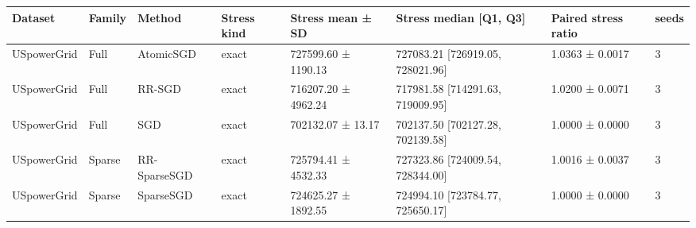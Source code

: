 \begin{tabular}{llllllll}
\hline
Dataset & Family & Method & Stress kind & Stress mean ± SD & Stress median [Q1, Q3] & Paired stress ratio & seeds \\
\hline
USpowerGrid & Full & AtomicSGD & exact & 727599.60 ± 1190.13 & 727083.21 [726919.05, 728021.96] & 1.0363 ± 0.0017 & 3 \\
USpowerGrid & Full & RR-SGD & exact & 716207.20 ± 4962.24 & 717981.58 [714291.63, 719009.95] & 1.0200 ± 0.0071 & 3 \\
USpowerGrid & Full & SGD & exact & 702132.07 ± 13.17 & 702137.50 [702127.28, 702139.58] & 1.0000 ± 0.0000 & 3 \\
USpowerGrid & Sparse & RR-SparseSGD & exact & 725794.41 ± 4532.33 & 727323.86 [724009.54, 728344.00] & 1.0016 ± 0.0037 & 3 \\
USpowerGrid & Sparse & SparseSGD & exact & 724625.27 ± 1892.55 & 724994.10 [723784.77, 725650.17] & 1.0000 ± 0.0000 & 3 \\
\hline
\end{tabular}
